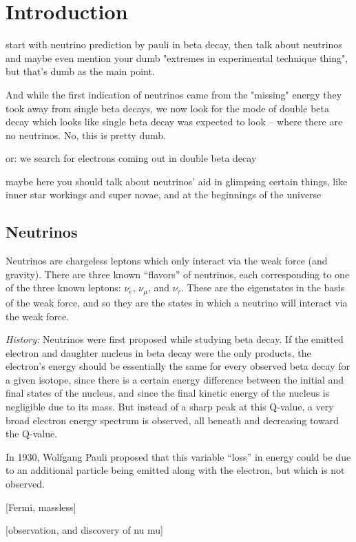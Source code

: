 \chapter{Introduction}

start with neutrino prediction by pauli in beta decay, then talk about neutrinos and maybe even mention your dumb "extremes in experimental technique thing", but that's dumb as the main point.

And while the first indication of neutrinos came from the "missing" energy they took away from single beta decays, we now look for the mode of double beta decay which looks like single beta decay was expected to look -- where there are no neutrinos.  No, this is pretty dumb.

or:  we search for electrons coming out in double beta decay 

maybe here you should talk about neutrinos' aid in glimpsing certain things, like inner star workings and super novae, and at the beginnings of the universe

\section{Neutrinos}

Neutrinos are chargeless leptons which only interact via the weak force (and gravity).  There are three known ``flavors'' of neutrinos, each corresponding to one of the three known leptons:  $\nu_{e}$, $\nu_{\mu}$, and $\nu_{\tau}$.  These are the eigenstates in the basis of the weak force, and so they are the states in which a neutrino will interact via the weak force.

{\color{gray}\emph{History:  }Neutrinos were first proposed while studying beta decay.  If the emitted electron and daughter nucleus in beta decay were the only products, the electron's energy should be essentially the same for every observed beta decay for a given isotope, since there is a certain energy difference between the initial and final states of the nucleus, and since the final kinetic energy of the nucleus is negligible due to its mass.  But instead of a sharp peak at this Q-value, a very broad electron energy spectrum is observed, all beneath and decreasing toward the Q-value.

In 1930, Wolfgang Pauli proposed that this variable ``loss'' in energy could be due to an additional particle being emitted along with the electron, but which is not observed.

[Fermi, massless]

[observation, and discovery of nu mu]}

